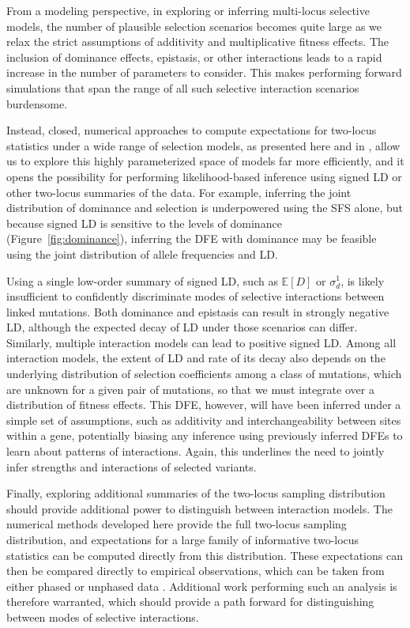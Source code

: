 \documentclass[]{article}
\newcommand{\E}{\mathbb{E}}
\begin{document}
From a modeling perspective, in exploring or inferring multi-locus selective
models, the number of plausible selection scenarios becomes quite large as we
relax the strict assumptions of additivity and multiplicative fitness effects.
The inclusion of dominance effects, epistasis, or other interactions leads to a
rapid increase in the number of parameters to consider. This makes performing
forward simulations that span the range of all such selective interaction
scenarios burdensome.

Instead, closed, numerical approaches to compute expectations for two-locus
statistics under a wide range of selection models, as presented here and in
\citet{Friedlander2022-bs}, allow us to explore this highly parameterized space
of models far more efficiently, and it opens the possibility for performing
likelihood-based inference using signed LD or other two-locus summaries of the
data. For example, inferring the joint distribution of dominance and selection
is underpowered using the SFS alone, but because signed LD is sensitive to the
levels of dominance (Figure~\ref{fig:dominance}), inferring the DFE with
dominance may be feasible using the joint distribution of allele frequencies
and LD.

Using a single low-order summary of signed LD, such as \(\E[D]\) or
\(\sigma_d^1\), is likely insufficient to confidently discriminate modes of
selective interactions between linked mutations. Both dominance and epistasis
can result in strongly negative LD, although the expected decay of LD under
those scenarios can differ. Similarly, multiple interaction models can lead to
positive signed LD. Among all interaction models, the extent of LD and rate of
its decay also depends on the underlying distribution of selection coefficients
among a class of mutations, which are unknown for a given pair of mutations, so
that we must integrate over a distribution of fitness effects. This DFE,
however, will have been inferred under a simple set of assumptions, such as
additivity and interchangeability between sites within a gene, potentially
biasing any inference using previously inferred DFEs to learn about patterns of
interactions. Again, this underlines the need to jointly infer strengths and
interactions of selected variants.

Finally, exploring additional summaries of the two-locus sampling distribution
should provide additional power to distinguish between interaction models. The
numerical methods developed here provide the full two-locus sampling
distribution, and expectations for a large family of informative two-locus
statistics can be computed directly from this distribution. These expectations
can then be compared directly to empirical observations, which can be taken
from either phased or unphased data \citep{Ragsdale2020-nz}. Additional work
performing such an analysis is therefore warranted, which should provide a path
forward for distinguishing between modes of selective interactions.
\end{document}
